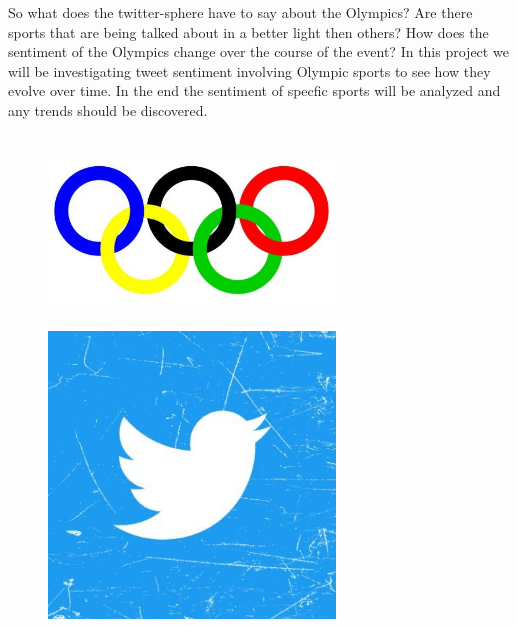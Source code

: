 \documentclass[12pt]{article}
\begin{document}
            So what does the twitter-sphere have to say about the Olympics? Are there sports that are being talked about in a better light then others? How does the sentiment of the Olympics 
            change over the course of the event? In this project we will be investigating tweet sentiment involving Olympic sports to see how they evolve over time. In the end the sentiment of 
            specfic sports will be analyzed and any trends should be discovered.

            \begin{figure}[htp]
                \includegraphics[width=3in, height=2in]{Rings2.jpg}
                \hspace{0.25in}
                \includegraphics[width=3in, height=3in]{Twitter.jpg}
            \end{figure}
\end{document}
